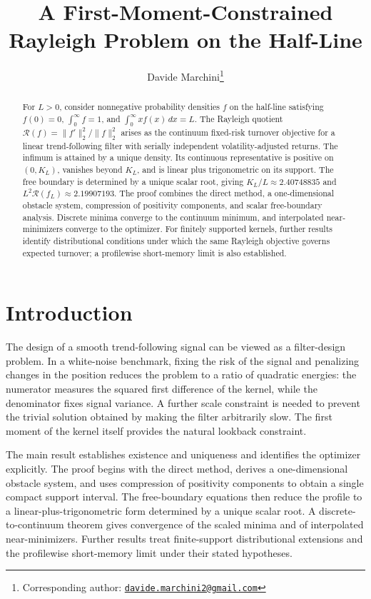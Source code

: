 \documentclass[11pt]{article}
\title{A First-Moment-Constrained Rayleigh Problem on the Half-Line}
\author{Davide Marchini\thanks{Corresponding author: \href{mailto:davide.marchini2@gmail.com}{\texttt{davide.marchini2@gmail.com}}}}
\date{}
\theoremstyle{definition}
\theoremstyle{remark}
\newcommand{\Rcal}{\mathcal R}
\begin{document}
\maketitle

\begin{abstract}
For $L>0$, consider nonnegative probability densities $f$ on the half-line satisfying
$f(0)=0$, $\int_0^\infty f=1$, and $\int_0^\infty xf(x)\,dx=L$. The Rayleigh
quotient $\Rcal(f)=\|f'\|_2^2/\|f\|_2^2$ arises as the continuum fixed-risk
turnover objective for a linear trend-following filter with serially independent
volatility-adjusted returns. The infimum is attained by a unique density. Its
continuous representative is positive on $(0,K_L)$, vanishes beyond $K_L$, and
is linear plus trigonometric on its support. The free boundary is determined by a
unique scalar root, giving $K_L/L\approx2.40748835$ and
$L^2\Rcal(f_L)\approx2.19907193$. The proof combines the direct method, a
one-dimensional obstacle system, compression of positivity components, and scalar
free-boundary analysis. Discrete minima converge to the continuum minimum, and
interpolated near-minimizers converge to the optimizer. For finitely supported
kernels, further results identify distributional conditions under which the same
Rayleigh objective governs expected turnover; a profilewise short-memory limit is
also established.
\end{abstract}


\section{Introduction}
The design of a smooth trend-following signal can be viewed as a filter-design
problem. In a white-noise benchmark, fixing the risk of the signal and
penalizing changes in the position reduces the problem to a ratio of quadratic
energies: the numerator measures the squared first difference of the kernel,
while the denominator fixes signal variance. A further scale constraint is
needed to prevent the trivial solution obtained by making the filter
arbitrarily slow. The first moment of the kernel itself provides the natural
lookback constraint.

The main result establishes existence and uniqueness and identifies the optimizer
explicitly. The proof begins with the direct method, derives a one-dimensional
obstacle system, and uses compression of positivity components to obtain a single
compact support interval. The free-boundary equations then reduce the profile to a
linear-plus-trigonometric form determined by a unique scalar root. A
discrete-to-continuum theorem gives convergence of the scaled minima and of
interpolated near-minimizers. Further results treat finite-support distributional
extensions and the profilewise short-memory limit under their stated hypotheses.
\end{document}
